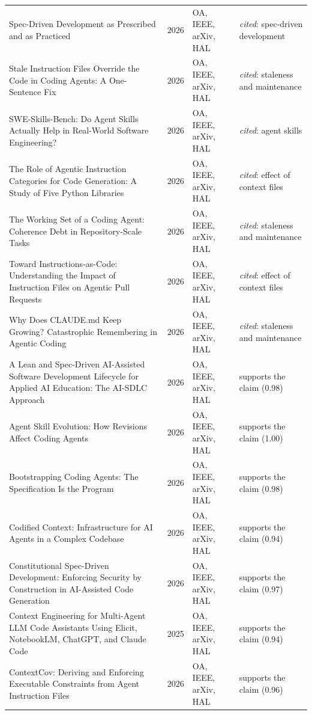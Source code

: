 \begin{longtable}{@{}%
  >{\raggedright\arraybackslash}p{}c%
  >{\raggedright\arraybackslash}p{}%
  >{\raggedright\arraybackslash}p{}@{}}
Spec-Driven Development as Prescribed and as Practiced & 2026 & OA, IEEE, arXiv, HAL & \emph{cited}: spec-driven development \\
Stale Instruction Files Override the Code in Coding Agents: A One-Sentence Fix & 2026 & OA, IEEE, arXiv, HAL & \emph{cited}: staleness and maintenance \\
SWE-Skills-Bench: Do Agent Skills Actually Help in Real-World Software Engineering? & 2026 & OA, IEEE, arXiv, HAL & \emph{cited}: agent skills \\
The Role of Agentic Instruction Categories for Code Generation: A Study of Five Python Libraries & 2026 & OA, IEEE, arXiv, HAL & \emph{cited}: effect of context files \\
The Working Set of a Coding Agent: Coherence Debt in Repository-Scale Tasks & 2026 & OA, IEEE, arXiv, HAL & \emph{cited}: staleness and maintenance \\
Toward Instructions-as-Code: Understanding the Impact of Instruction Files on Agentic Pull Requests & 2026 & OA, IEEE, arXiv, HAL & \emph{cited}: effect of context files \\
Why Does CLAUDE.md Keep Growing? Catastrophic Remembering in Agentic Coding & 2026 & OA, IEEE, arXiv, HAL & \emph{cited}: staleness and maintenance \\
A Lean and Spec-Driven AI-Assisted Software Development Lifecycle for Applied AI Education: The AI-SDLC Approach & 2026 & OA, IEEE, arXiv, HAL & supports the claim (0.98) \\
Agent Skill Evolution: How Revisions Affect Coding Agents & 2026 & OA, IEEE, arXiv, HAL & supports the claim (1.00) \\
Bootstrapping Coding Agents: The Specification Is the Program & 2026 & OA, IEEE, arXiv, HAL & supports the claim (0.98) \\
Codified Context: Infrastructure for AI Agents in a Complex Codebase & 2026 & OA, IEEE, arXiv, HAL & supports the claim (0.94) \\
Constitutional Spec-Driven Development: Enforcing Security by Construction in AI-Assisted Code Generation & 2026 & OA, IEEE, arXiv, HAL & supports the claim (0.97) \\
Context Engineering for Multi-Agent LLM Code Assistants Using Elicit, NotebookLM, ChatGPT, and Claude Code & 2025 & OA, IEEE, arXiv, HAL & supports the claim (0.94) \\
ContextCov: Deriving and Enforcing Executable Constraints from Agent Instruction Files & 2026 & OA, IEEE, arXiv, HAL & supports the claim (0.96) \\

\end{longtable}
